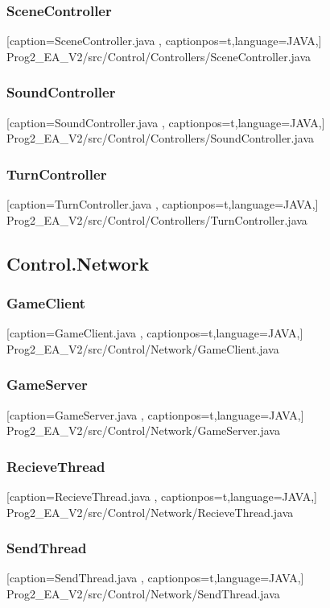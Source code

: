 \documentclass[a4paper,12pt]{scrartcl}
\begin{document}
	\subsubsection{SceneController}
	
	[caption={SceneController.java}
	\label{lst:javaclass},
	captionpos=t,language=JAVA,]
	{Prog2_EA_V2/src/Control/Controllers/SceneController.java}
	\subsubsection{SoundController}
	
	[caption={SoundController.java}
	\label{lst:javaclass},
	captionpos=t,language=JAVA,]
	{Prog2_EA_V2/src/Control/Controllers/SoundController.java}
	\subsubsection{TurnController}
	
	[caption={TurnController.java}
	\label{lst:javaclass},
	captionpos=t,language=JAVA,]
	{Prog2_EA_V2/src/Control/Controllers/TurnController.java}
	\subsection{Control.Network}
	\subsubsection{GameClient}
	
	[caption={GameClient.java}
	\label{lst:javaclass},
	captionpos=t,language=JAVA,]
	{Prog2_EA_V2/src/Control/Network/GameClient.java}
	\subsubsection{GameServer}
	
	[caption={GameServer.java}
	\label{lst:javaclass},
	captionpos=t,language=JAVA,]
	{Prog2_EA_V2/src/Control/Network/GameServer.java}
	\subsubsection{RecieveThread}
	
	[caption={RecieveThread.java}
	\label{lst:javaclass},
	captionpos=t,language=JAVA,]
	{Prog2_EA_V2/src/Control/Network/RecieveThread.java}
	\subsubsection{SendThread}
	
	[caption={SendThread.java}
	\label{lst:javaclass},
	captionpos=t,language=JAVA,]
	{Prog2_EA_V2/src/Control/Network/SendThread.java}
\end{document}
